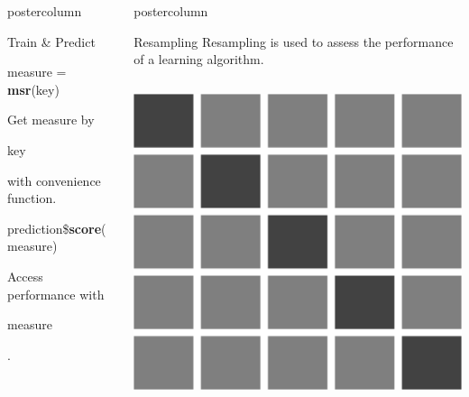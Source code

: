 \documentclass{beamer}
\newlength{\columnheight} %
\newcommand{\codeinline}[1]{\begin{codeboxinline}#1\end{codeboxinline}}
\begin{document}
\begin{frame}[fragile]{}
\begin{columns}
\begin{column}{.245\textwidth}
\begin{beamercolorbox}[center]{postercolumn}
\begin{minipage}{.98\textwidth}
{\begin{myblock}{Train \& Predict}
\begin{codebox}
								measure = \textbf{msr}(key)
							\end{codebox}
							Get measure by \codeinline{key} with convenience function.
							\\
							\begin{codebox}
								prediction\$\textbf{score}(measure)
							\end{codebox}
							Access performance with \codeinline{measure}.
						\end{myblock}
					}
				\end{minipage}
			\end{beamercolorbox}
		\end{column}
		\begin{column}{.245\textwidth}
			\begin{beamercolorbox}[center]{postercolumn}
				\begin{minipage}{.98\textwidth}
					\parbox[t][\columnheight]{\textwidth}{
						\begin{myblock}{Resampling}
							Resampling is used to assess the performance of a learning algorithm.
							\\[\baselineskip]
							\begin{minipage}{\textwidth}
								\begin{columns}[T]
									\begin{column}{0.2\textwidth}\leftskip=14pt
										\includegraphics[width=\textwidth]{img/cross_validation.png}
									\end{column}

\end{columns}
\end{minipage}
\end{myblock}}
\end{minipage}
\end{beamercolorbox}
\end{column}
\end{columns}
\end{frame}
\end{document}
